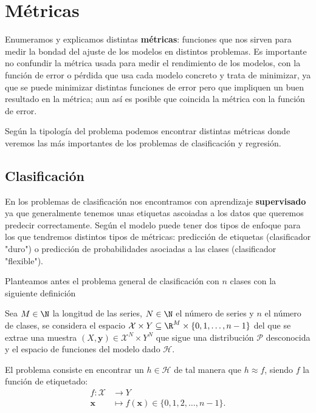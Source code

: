 %

\chapter{Métricas}\label{ch:metricas}

Enumeramos y explicamos distintas \textbf{métricas}: funciones que nos sirven para medir la bondad del ajuste de los modelos en distintos problemas. Es importante no confundir la métrica usada para medir el rendimiento de los modelos, con la función de error o pérdida que usa cada modelo concreto y trata de minimizar, ya que se puede minimizar distintas funciones de error pero que impliquen un buen resultado en la métrica; aun así es posible que coincida la métrica con la función de error.

Según la tipología del problema podemos encontrar distintas métricas donde veremos las más importantes de los problemas de clasificación y regresión.

\section{Clasificación}

En los problemas de clasificación nos encontramos con aprendizaje \textbf{supervisado} ya que generalmente tenemos unas etiquetas ascoiadas a los datos que queremos predecir correctamente. Según el modelo puede tener dos tipos de enfoque para los que tendremos distintos tipos de métricas: predicción de etiquetas (clasificador "duro") o predicción de probabilidades asociadas a las clases (clasificador "flexible").

Planteamos antes el problema general de clasificación con $n$ clases con la siguiente definición

\begin{definicion}
  Sea $M \in \N$ la longitud de las series, $N \in \N$ el número de series y $n$ el número de clases, se considera el espacio $\mathcal{X} \times Y \subseteq \R^M \times \{0, 1, \ldots, n - 1\}$ del que se extrae una muestra $(X, \textbf{y}) \in \mathcal{X}^N \times Y^N$ que sigue una distribución $\mathcal{P}$ desconocida y el espacio de funciones del modelo dado $\mathcal{H}$.

  El problema consiste en encontrar un $h \in \mathcal{H}$ de tal manera que $h \approx f$, siendo $f$ la función de etiquetado:
  \begin{align*}
    f : \mathcal{X} & \to Y \\
    \textbf{x} & \mapsto f(\textbf{x}) \in \{0, 1, 2, \ldots, n - 1\}.
  \end{align*}
  \label{def:clasgen}
\end{definicion}

